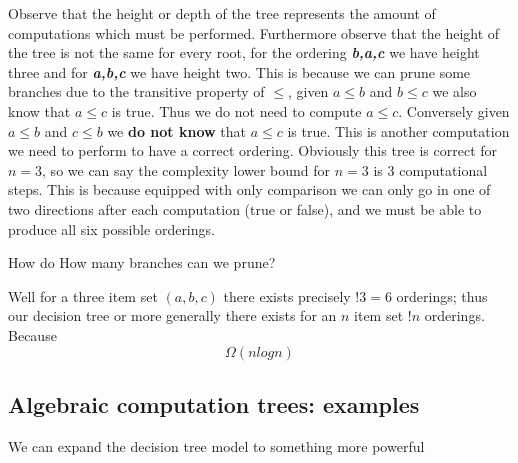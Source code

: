 \documentclass{article}
\theoremstyle{definition}
\begin{document}
\begin{center}
\end{center}

Observe that the height or depth of the tree represents the amount of computations which must be performed.
Furthermore observe that the height of the tree is not the same for every root,
for the ordering \textbf{\textit{b,a,c}} we have height three
and for \textbf{\textit{a,b,c}} we have height two.
This is because we can prune some branches due to the transitive property of $\leq$,
given $a \leq b$ and $b \leq c$ we also know that $a \leq c$ is true.
Thus we do not need to compute $a \leq c$.
Conversely given $a \leq b$ and $c \leq b$ we \textbf{do not know} that $a \leq c$ is true.
This is another computation we need to perform to have a correct ordering.
Obviously this tree is correct for $n = 3$, so we can say
the complexity lower bound for $n = 3$ is 3 computational steps.
This is because equipped with only comparison we can only go in one
of two directions after each computation (true or false),
and we must be able to produce all six possible orderings.

How do
How many branches can we prune?

Well for a three item set $(a,b,c)$ there exists precisely $!3 = 6$ orderings;
thus our decision tree 
or more generally there exists for an $n$ item set $!n$ orderings.
Because
$$\Omega(n log n)$$


\subsection{Algebraic computation trees: examples}
We can expand the decision tree model to something more powerful
\end{document}
